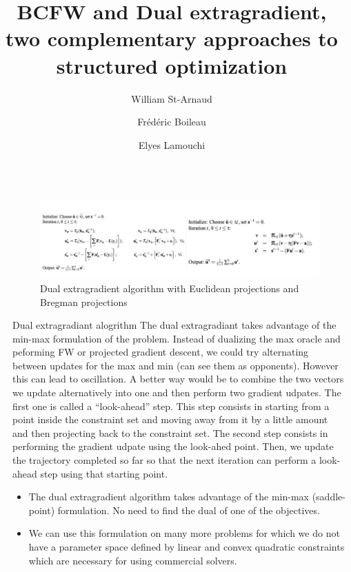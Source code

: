 \documentclass[final]{beamer}
\title{BCFW and Dual extragradient, two complementary approaches to structured optimization}
\author{William St-Arnaud\inst{1} \and Fr\'ed\'eric Boileau \inst{1} \and Elyes Lamouchi\inst{1}}
\institute[shortinst]{\inst{1} Universit\'e de Montr\'eal}
\newlength{\sepwidth}
\newlength{\colwidth}
\newcommand{\separatorcolumn}{\begin{column}{\sepwidth}\end{column}}
\begin{document}
\begin{frame}[t]
\begin{columns}[t]
\separatorcolumn

\begin{column}{\colwidth}

  \begin{block}{}

    \begin{figure}
      \includegraphics{img/extra_grad.jpg}
      \caption{Dual extragradient algorithm with Euclidean projections and Bregman projections}
      \label{extragrad}
    \end{figure}
  \end{block}


  \begin{block}{Dual extragradiant alogrithm}
    The dual extragradiant takes advantage of the min-max formulation of the problem. Instead of dualizing the max oracle and peforming FW or projected gradient descent, we could try alternating between updates for the max and min (can see them as opponents).
    However this can lead to oscillation. 
    A better way would be to combine the two vectors we update alternatively into one and then perform two gradient udpates. The
    first one is called a ``look-ahead'' step. This step consists in starting from a point inside the constraint set and moving away
    from it  by a little amount and then projecting back to the constraint set. The second step consists in performing the gradient
    udpate using the look-ahed point. Then, we update the trajectory completed so far so that the next iteration can perform a  look-ahead
    step using that starting point.
    \begin{itemize}
      \item The dual extragradient algorithm takes advantage of the min-max (saddle-point) formulation. No need to find the dual of
	one of the objectives.
      \item We can use this formulation on many more problems for which we do not have a parameter space defined
	by linear and convex quadratic constraints which are necessary for using commercial solvers.
    \end{itemize}


\end{block}
\end{column}
\end{columns}
\end{frame}
\end{document}
